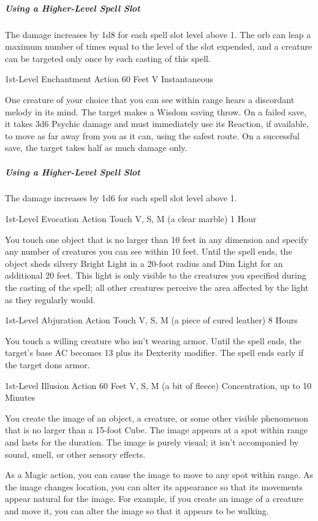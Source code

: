 \documentclass[letterpaper,openany,oneside,twocolumn]{book}
\begin{document}
\subparagraph*{Using a Higher-Level Spell Slot} The damage increases by 1d8 for each spell slot level above 1. The orb can leap a maximum number of times equal to the level of the slot expended, and a creature can be targeted only once by each casting of this spell.

	{1st-Level Enchantment}
	{Action}
	{60 Feet}
	{V}
	{Instantaneous}

One creature of your choice that you can see within range hears a discordant melody in its mind. The target makes a Wisdom saving throw. On a failed save, it takes 3d6 Psychic damage and must immediately use its Reaction, if available, to move as far away from you as it can, using the safest route. On a successful save, the target takes half as much damage only.

\subparagraph*{Using a Higher-Level Spell Slot} The damage increases by 1d6 for each spell slot level above 1.

	{1st-Level Evocation}
	{Action}
	{Touch}
	{V, S, M (a clear marble)}
	{1 Hour}

You touch one object that is no larger than 10 feet in any dimension and specify any number of creatures you can see within 10 feet. Until the spell ends, the object sheds silvery Bright Light in a 20-foot radius and Dim Light for an additional 20 feet. This light is only visible to the creatures you specified during the casting of the spell; all other creatures perceive the area affected by the light as they regularly would.

	{1st-Level Abjuration}
	{Action}
	{Touch}
	{V, S, M (a piece of cured leather)}
	{8 Hours}

You touch a willing creature who isn't wearing armor. Until the spell ends, the target's base AC becomes 13 plus its Dexterity modifier. The spell ends early if the target dons armor.

	{1st-Level Illusion}
	{Action}
	{60 Feet}
	{V, S, M (a bit of fleece)}
	{Concentration, up to 10 Minutes}

You create the image of an object, a creature, or some other visible phenomenon that is no larger than a 15-foot Cube. The image appears at a spot within range and lasts for the duration. The image is purely visual; it isn't accompanied by sound, smell, or other sensory effects.

As a Magic action, you can cause the image to move to any spot within range. As the image changes location, you can alter its appearance so that its movements appear natural for the image. For example, if you create an image of a creature and move it, you can alter the image so that it appears to be walking.
\end{document}
